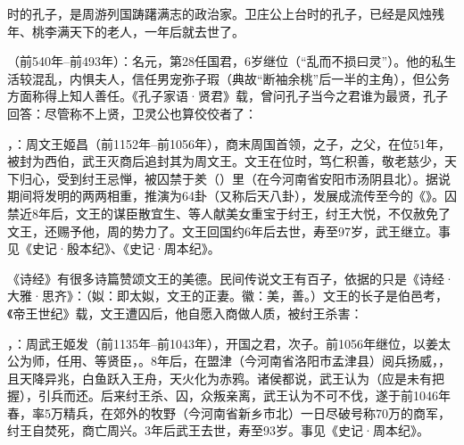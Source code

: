 时的孔子，是周游列国踌躇满志的政治家。卫庄公上台时的孔子，已经是风烛残年、桃李满天下的老人，一年后就去世了。

（前540年--前493年）：名元，第28任国君，6岁继位（“乱而不损曰灵”）。他的私生活较混乱，内惧夫人，信任男宠弥子瑕（典故“断袖余桃”后一半的主角），但公务方面称得上知人善任。《孔子家语·贤君》载，曾问孔子当今之君谁为最贤，孔子回答：尽管称不上贤，卫灵公也算佼佼者了：

，：周文王姬昌（前1152年--前1056年），商末周国首领，之子，之父，在位51年，被封为西伯，武王灭商后追封其为周文王。文王在位时，笃仁积善，敬老慈少，天下归心，受到纣王忌惮，被囚禁于羑（）里（在今河南省安阳市汤阴县北）。据说期间将发明的两两相重，推演为64卦（又称后天八卦），发展成流传至今的《》。囚禁近8年后，文王的谋臣散宜生、等人献美女重宝于纣王，纣王大悦，不仅赦免了文王，还赐予他，周的势力了。文王回国约6年后去世，寿至97岁，武王继立。事见《史记·殷本纪》、《史记·周本纪》。

《诗经》有很多诗篇赞颂文王的美德。民间传说文王有百子，依据的只是《诗经·大雅·思齐》：（姒：即太姒，文王的正妻。徽：美，善。）文王的长子是伯邑考，《帝王世纪》载，文王遭囚后，他自愿入商做人质，被纣王杀害： %

，：周武王姬发（前1135年--前1043年），开国之君，次子。前1056年继位，以姜太公为师，任用、等贤臣，。8年后，在盟津（今河南省洛阳市孟津县）阅兵扬威，，且天降异兆，白鱼跃入王舟，天火化为赤鸦。诸侯都说，武王认为（应是未有把握），引兵而还。后来纣王杀、囚，众叛亲离，武王认为不可不伐，遂于前1046年春，率5万精兵，在郊外的牧野（今河南省新乡市北）一日尽破号称70万的商军，纣王自焚死，商亡周兴。3年后武王去世，寿至93岁。事见《史记·周本纪》。

